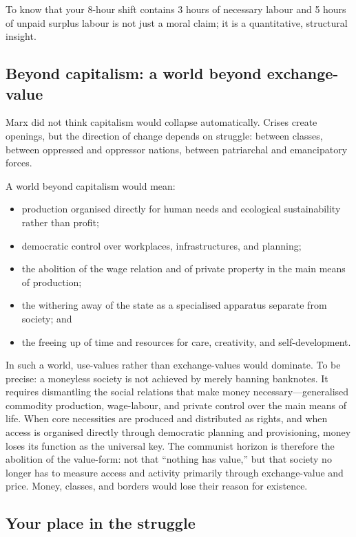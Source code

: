 To know that your 8-hour shift contains 3 hours of necessary labour and 5
hours of unpaid surplus labour is not just a moral claim; it is a
quantitative, structural insight.

\subsection{Beyond capitalism: a world beyond exchange-value}

Marx did not think capitalism would collapse automatically. Crises create
openings, but the direction of change depends on struggle: between classes,
between oppressed and oppressor nations, between patriarchal and emancipatory
forces.

A world beyond capitalism would mean:

\begin{itemize}[leftmargin=1.5em]
  \item production organised directly for human needs and ecological
  sustainability rather than profit;
  \item democratic control over workplaces, infrastructures, and planning;
  \item the abolition of the wage relation and of private property in the
  main means of production;
  \item the withering away of the state as a specialised apparatus separate
  from society; and
  \item the freeing up of time and resources for care, creativity, and
  self-development.
\end{itemize}

In such a world, use-values rather than exchange-values would dominate. To be precise: a moneyless society is not achieved by merely banning banknotes. It requires dismantling
the social relations that make money necessary---generalised commodity production, wage-labour, and private
control over the main means of life. When core necessities are produced and distributed as rights, and when
access is organised directly through democratic planning and provisioning, money loses its function as the
universal key. The communist horizon is therefore the abolition of the value-form: not that ``nothing has
value,'' but that society no longer has to measure access and activity primarily through exchange-value and price. Money, classes, and borders would lose their reason for existence.

\subsection{Your place in the struggle}

